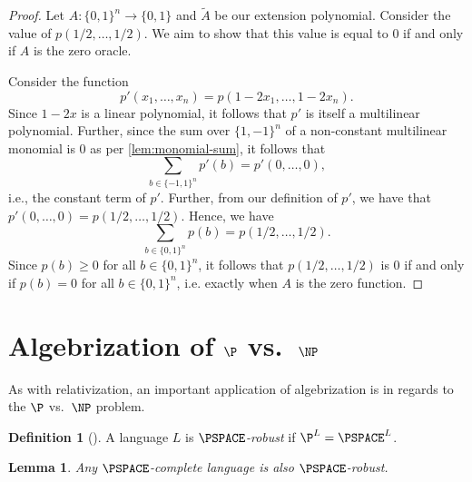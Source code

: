\documentclass[english,12pt]{reedthesis}
\theoremstyle{plain}
\newtheorem{lemma}[lemma]{Lemma}
\theoremstyle{definition}
\newtheorem{defn}[defn]{Definition}
\theoremstyle{remark}
\begin{document}
\begin{proof}
  Let $A\colon \{0, 1\}^{n} \rightarrow \{0, 1\}$ and $\tilde{A}$ be our extension
  polynomial. Consider the value of $p(1/2, \ldots, 1/2)$. We aim to show that this
  value is equal to $0$ if and only if $A$ is the zero oracle.

  Consider the function
  \begin{equation}
    p'(x_{1}, \ldots, x_{n}) = p(1 - 2x_{1}, \ldots, 1 - 2x_{n}).
  \end{equation}
  Since $1 - 2x$ is a linear polynomial, it follows that $p'$ is itself a
  multilinear polynomial. Further, since the sum over $\{1, -1\}^{n}$ of a
  non-constant multilinear monomial is 0 as per \cref{lem:monomial-sum}, it
  follows that
  \begin{equation}
    \sum_{b \in \{-1, 1\}^{n}}p'(b) = p'(0, \ldots, 0),
  \end{equation}
  i.e., the constant term of $p'$. Further, from our definition of $p'$, we have
  that $p'(0, \ldots, 0) = p(1/2, \ldots, 1/2)$. Hence, we have
  \begin{equation}
    \sum_{b \in \{0, 1\}^{n}}p(b) = p(1/2, \ldots, 1/2).
  \end{equation}
  Since $p(b) \ge 0$ for all $b \in \{0, 1\}^{n}$, it follows that $p(1/2, \ldots, 1/2)$
  is 0 if and only if $p(b) = 0$ for all $b \in \{0, 1\}^{n}$, i.e. exactly when
  $A$ is the zero function.
\end{proof}


\section{Algebrization of $\P$ vs.\ $\NP$}\label{sec:alg-p-np}

As with relativization, an important application of algebrization is in regards
to the $\P$ vs.\ $\NP$ problem.

\begin{defn}[{\cite[Def.\ 6.1]{BFL90}}]\label{def:pspace-robust}
  A language $L$ is \emph{$\PSPACE$-robust} if $\P^{L} = \PSPACE^{L}$.
\end{defn}

\begin{lemma}\label{lem:complete-is-robust}
  Any $\PSPACE$-complete language is also $\PSPACE$-robust.
\end{lemma}
\end{document}
